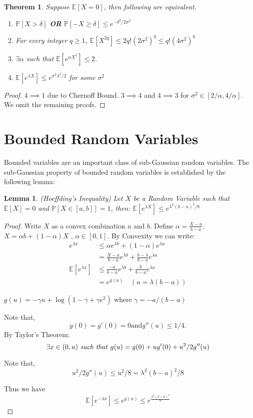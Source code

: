 \documentclass[10pt]{article}
\newcounter{lecnum}
\newtheorem{theorem}{Theorem}[lecnum]
\newtheorem{lemma}[lemma]{Lemma}
\renewcommand{\P}{\mathbb{P}}
\begin{document}
 \begin{theorem}
 	Suppose $\mathbb{E}[X = 0]$, then following are equivalent.
 	\begin{enumerate}
 	 \item  $\P[X > \delta]$ \textbf{OR} $\P[-X \ge \delta] \le e^{-\delta^{2}/2\sigma^{2}}$
 	 \item  For every integer $q \ge 1$, $\mathbb{E}[X^{2q}] \le 2q!(2\sigma^2)^q \le q! (4 \sigma^2)^q$
 
 	 \item $\exists \alpha$ such that $\mathbb{E}[e^{\alpha X^2}] \le 2$.
 	 \item $\mathbb{E}[e^{\lambda X}] \le e^{\sigma^2 \lambda^2 / 2}$ for some $\sigma^2$
	\end{enumerate}	
 \end{theorem}
\begin{proof}
	$4 \implies 1$ due to Chernoff Bound. $3 \implies 4$ and $4 \implies 3$ for $\sigma^2 \in [2/\alpha, 4/\alpha]$. We omit the remaining proofs. 
\end{proof}

\section{Bounded Random Variables}
Bounded variables are an important class of sub-Gaussian
random variables. The sub-Gaussian property of bounded random variables is
established by the following lemma:
\begin{lemma}(Hoeffding's Inequality)
	Let $X$ be a Random Variable such that $\mathbb{E}[X] = 0$ and $\P[X \in [a,b]] = 1$, then: $\mathbb{E}[e^{\lambda X}] \le e^{\lambda^2(b - a)^2/8}$
\end{lemma}
\begin{proof}
	Write $X$ as a convex combination $a$ and $b$. Define $\alpha = \frac{X - a}{b - a}$. $X = \alpha b + (1 - \alpha) X$ , $\alpha \in [0,1]$.
	By Convexity we can write:
	\begin{align*}
	 e^{\lambda x} &\le \alpha e^{\lambda b} + (1 - \alpha) e^{\lambda a}\\
	 				&= \frac{X - a}{b - a} e^{\lambda b} + \frac{b - \lambda}{b - a} e^{\lambda a} \\
	 	\mathbb{E}[e^{\lambda x}] &\le \frac{-a}{b - a}e^{\lambda b} + \frac{b}{b - a}e^{\lambda a} \\
	 	 &= e^{g(u)} \quad (u = \lambda(b - a))
	\end{align*}
	
	$g(u) = -\gamma u + \log(1 - \gamma + \gamma e^2)$ where $\gamma = -a/(b - a)$
	
	Note that, 
	\[
	g(0) = g'(0) = 0 \text{and} g''(u) \le 1/4.
	\] 
	By Taylor's Theorem: 
	\[
	\exists x \in (0, u) \text{ \textit{such that} } g(u) = g(0) + u g'(0) + u^{2}/2 g''(u)
	\]
	
	Note that, 
	\[
	u^2/2 g''(u) \le u^{2}/8 = \lambda^2 (b - a)^2 /8
	\] 
	
	Thus we have 
	\[
	\mathbb{E}[e^{-\lambda x}] \le e^{g(u)} \le e^{\frac{\lambda^2 (b - a)^2}{8}}
	\]
	
\end{proof}
	
	
	
	
\end{document}

